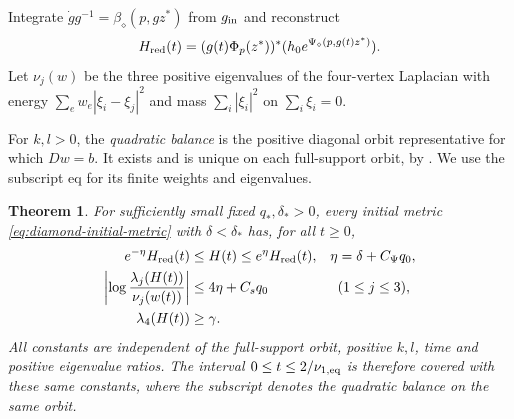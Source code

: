 \documentclass[11pt]{amsart}
\newtheorem{theorem}{Theorem}[section]
\theoremstyle{definition}
\theoremstyle{remark}
\begin{document}
Integrate $\dot g g^{-1}=\beta_\diamond(p,gz^*)$ from $g_{\rm in}$
and reconstruct
\begin{equation}\label{eq:diamond-reconstruction}
 H_{\rm red}(t)=(g(t)\Phi_p(z^*))^*
          (h_0e^{\Psi_\diamond(p,g(t)z^*)}).
\end{equation}
Let $\nu_j(w)$ be the three positive eigenvalues of the
four-vertex Laplacian with energy
$\sum_e w_e|\xi_i-\xi_j|^2$ and mass $\sum_i|\xi_i|^2$ on
$\sum_i\xi_i=0$.

For $k,l>0$, the \emph{quadratic balance} is the positive diagonal
orbit representative for which $Dw=b$. It exists and is unique
on each full-support orbit, by \cite[Section 7.1]{WuebbenThreeStep26}.
We use the subscript $\mathrm{eq}$ for its finite weights and eigenvalues.

\begin{theorem}\label{thm:diamond-comparison}
For sufficiently small fixed $q_*,\delta_*>0$, every initial
metric \eqref{eq:diamond-initial-metric} with $\delta<\delta_*$
has, for all $t\ge0$,
\begin{equation}\label{eq:diamond-comparison}
 \begin{aligned}
 e^{-\eta}H_{\rm red}(t)&\le H(t)\le e^\eta H_{\rm red}(t),
       &\eta&=\delta+C_\Psi q_0,\\
 \left|\log\frac{\lambda_j(H(t))}{\nu_j(w(t))}\right|
       &\le4\eta+C_sq_0 &&(1\le j\le3),\\
 \lambda_4(H(t))&\ge\gamma .
 \end{aligned}
\end{equation}
All constants are independent of the full-support orbit,
positive $k,l$, time and positive eigenvalue ratios.
The interval $0\le t\le2/\nu_{1,\rm eq}$ is therefore covered
with these same constants, where the subscript denotes the
quadratic balance on the same orbit.
\end{theorem}
\end{document}

